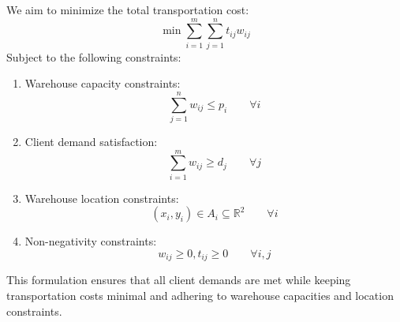 \begin{example}
    We aim to minimize the total transportation cost:
    \[\min\sum_{i=1}^{m}\sum_{j=1}^{n}t_{ij}w_{ij}\]
    Subject to the following constraints:
    \begin{enumerate}
        \item Warehouse capacity constraints: 
            \[\sum_{j=1}^{n}w_{ij}\leq p_i \qquad \forall i\]
        \item Client demand satisfaction:
            \[\sum_{i=1}^{m}w_{ij}\geq d_j \qquad \forall j\]
        \item Warehouse location constraints: 
            \[(x_i,y_i)\in A_i\subseteq\mathbb{R}^2 \qquad \forall i\]
        \item Non-negativity constraints: 
            \[w_{ij}\geq 0, t_{ij}\geq 0\qquad\forall i,j\]
    \end{enumerate}
    This formulation ensures that all client demands are met while keeping transportation costs minimal and adhering to warehouse capacities and location constraints.
\end{example}

